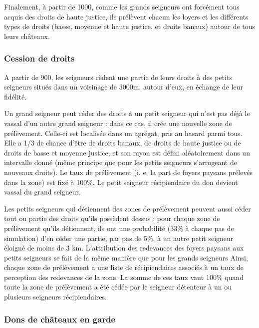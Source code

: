 \documentclass[a4paper,11pt]{article}
\begin{document}
{Finalement, à partir de 1000, comme les grands seigneurs ont forcément tous acquis des droits de haute justice, ils prélèvent chacun les loyers et les différents types de droits (basse, moyenne et haute justice, et droits banaux) autour de tous leurs châteaux.


\subsubsection{Cession de droits}\label{cession-droits}

A partir de 900, les seigneurs cèdent une partie de leurs droits à des petits seigneurs situés dans un voisinage de 3000m. autour d'eux, en échange de leur fidélité.

\bigskip
Un grand seigneur peut céder des droits à un petit seigneur qui n'est pas déjà le vassal d'un autre grand seigneur : dans ce cas, il crée une nouvelle zone de prélèvement. Celle-ci est localisée dans un agrégat, pris au hasard parmi tous. Elle a 1/3 de chance d'être de droits banaux, de droits de haute justice ou de droits de basse et moyenne justice, et son rayon est défini aléatoirement dans un intervalle donné (même principe que pour les petits seigneurs s'arrogeant de nouveaux droits). Le taux de prélèvement (i. e. la part de foyers paysans prélevés dans la zone) est fixé à 100\%. Le petit seigneur récipiendaire du don devient vassal du grand seigneur.

\bigskip
Les petits seigneurs qui détiennent des zones de prélèvement peuvent aussi céder tout ou partie des droits qu'ils possèdent dessus : pour chaque zone de prélèvement qu'ils détiennent, ils ont une probabilité (33\% à chaque pas de simulation) d'en céder une partie, par pas de 5\%, à un autre petit seigneur éloigné de moins de 3 km. L'attribution des redevances des foyers paysans aux petits seigneurs se fait de la même manière que pour les grands seigneurs Ainsi, chaque zone de prélèvement a une liste de récipiendaires associés à un taux de perception des redevances de la zone. La somme de ces taux vaut 100\% quand toute la zone de prélèvement a été cédée par le seigneur détenteur à un ou plusieurs seigneurs récipiendaires.

\subsubsection{Dons de châteaux en garde}

}
\end{document}
